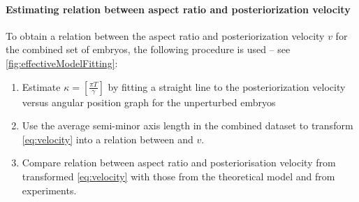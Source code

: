 \paragraph{Estimating relation between aspect ratio and posteriorization velocity}
To obtain a relation between the aspect ratio \aspectRatio and posteriorization velocity $v$ for the combined set of embryos, the following procedure is used -- see \autoref{fig:effectiveModelFitting}:
\begin{enumerate}
    \item Estimate $\kappa = \left[\frac{\pi T}{\gamma}\right]$ by fitting a straight line to the posteriorization velocity versus angular position graph for the unperturbed embryos
    \item Use the average semi-minor axis length in the combined dataset to transform \eqref{eq:velocity} into a relation between \aspectRatio and $v$.
    \item Compare relation between aspect ratio and posteriorisation velocity from transformed \eqref{eq:velocity} with those from the theoretical model and from experiments.
\end{enumerate}

